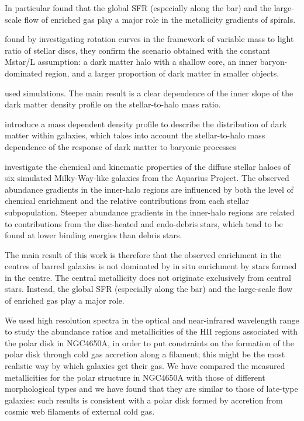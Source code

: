 \documentclass[12pt,a4paper]{article}
\begin{document}
    In particular 
    \citet{martel13} found that the global SFR (especially along the bar) and
    the large-scale flow of enriched gas play a major role in the metallicity
    gradients of spirals.

    \citet{portinari10} found by investigating rotation curves in the framework
    of variable mass to light ratio of stellar discs, they confirm the scenario
    obtained with the constant Mstar/L assumption: a dark matter halo with a
    shallow core, an inner baryon-dominated region, and a larger proportion of
    dark matter in smaller objects.

    \citet{dicintio14} used simulations. The main result is a clear dependence
    of the inner slope of the dark matter density profile on the
    stellar-to-halo mass ratio.

    \citet{dicintio14b} introduce a mass dependent density profile to describe
    the distribution of dark matter within galaxies, which takes into account
    the stellar-to-halo mass dependence of the response of dark matter to
    baryonic processes

    \citet{tissera13} investigate the chemical and kinematic properties of the
    diffuse stellar haloes of six simulated Milky-Way-like galaxies from the
    Aquarius Project. The observed abundance gradients in the inner-halo
    regions are influenced by both the level of chemical enrichment and the
    relative contributions from each stellar subpopulation. Steeper abundance
    gradients in the inner-halo regions are related to contributions from the
    disc-heated and endo-debris stars, which tend to be found at lower binding
    energies than debris stars. 

    \citet{martel13} The main result of this work is therefore that the
    observed enrichment in the centres of barred galaxies is not dominated by
    in situ enrichment by stars formed in the centre. The central metallicity
    does not originate exclusively from central stars. Instead, the global SFR
    (especially along the bar) and the large-scale flow of enriched gas play a
    major role.

    \citet{spavone10} We used high resolution spectra in the optical and
    near-infrared wavelength range to study the abundance ratios and
    metallicities of the HII regions associated with the polar disk in
    NGC4650A, in order to put constraints on the formation of the polar disk
    through cold gas accretion along a filament; this might be the most
    realistic way by which galaxies get their gas. We have compared the
    measured metallicities for the polar structure in NGC4650A with those of
    different morphological types and we have found that they are similar to
    those of late-type galaxies: such results is consistent with a polar disk
    formed by accretion from cosmic web filaments of external cold gas.
\end{document}
